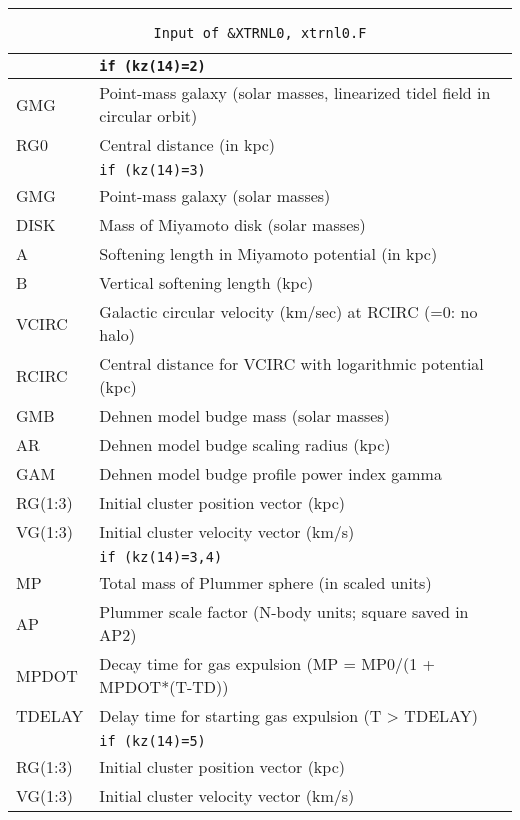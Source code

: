 \hrule
\noindent
\begin{longtable}{@{}p{1.5cm}p{13.0cm}}
\caption{\texttt{Input of \&XTRNL0, xtrnl0.F}}
\label{table:indata}\\\hline
       & \texttt{if (kz(14)=2)} \\\hline
GMG    & Point-mass galaxy (solar masses, linearized tidel field in circular orbit) \\
RG0    & Central distance (in kpc) \\\hline
       & \texttt{if (kz(14)=3)} \\\hline
GMG    & Point-mass galaxy (solar masses) \\
DISK   & Mass of Miyamoto disk (solar masses) \\
A      & Softening length in Miyamoto potential (in kpc) \\
B      & Vertical softening length (kpc) \\
VCIRC  & Galactic circular velocity (km/sec) at RCIRC (=0: no halo) \\
RCIRC  & Central distance for VCIRC with logarithmic potential (kpc) \\
GMB    & Dehnen model budge mass (solar masses)\\
AR     & Dehnen model budge scaling radius (kpc)\\
GAM    & Dehnen model budge profile power index gamma \\  
RG(1:3) & Initial cluster position vector (kpc) \\
VG(1:3) & Initial cluster velocity vector (km/s) \\\hline
       & \texttt{if (kz(14)=3,4)} \\\hline
MP     & Total mass of Plummer sphere (in scaled units) \\
AP     & Plummer scale factor (N-body units; square saved in AP2) \\
MPDOT  & Decay time for gas expulsion (MP = MP0/(1 + MPDOT*(T-TD)) \\
TDELAY & Delay time for starting gas expulsion (T > TDELAY) \\\hline
       & \texttt{if (kz(14)=5)} \\\hline
RG(1:3) & Initial cluster position vector (kpc) \\
VG(1:3) & Initial cluster velocity vector (km/s) \\ 
\end{longtable}

